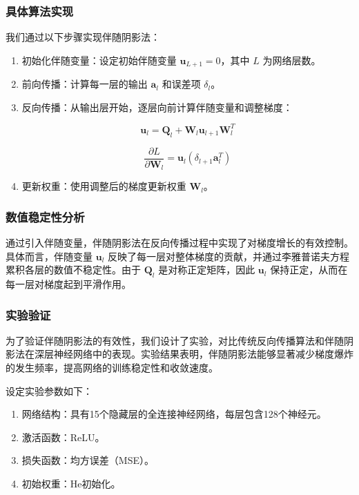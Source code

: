 \documentclass[12pt,a4paper]{amsart}
\begin{document}
\subsubsection{具体算法实现}

我们通过以下步骤实现伴随阴影法：

\begin{enumerate}

  \item 初始化伴随变量：设定初始伴随变量 \( \mathbf{u}_{L+1} = 0 \)，其中 \( L \) 为网络层数。

  \item 前向传播：计算每一层的输出 \( \mathbf{a}_l \) 和误差项 \( \delta_l \)。

  \item 反向传播：从输出层开始，逐层向前计算伴随变量和调整梯度：

  \[ \mathbf{u}_l = \mathbf{Q}_l + \mathbf{W}_l \mathbf{u}_{l+1} \mathbf{W}_l^T \]

  \[ \frac{\partial L}{\partial \mathbf{W}_l} = \mathbf{u}_l (\delta_{l+1} \mathbf{a}_l^T) \]

  \item 更新权重：使用调整后的梯度更新权重 \( \mathbf{W}_l \)。

\end{enumerate}

\subsubsection{数值稳定性分析}

通过引入伴随变量，伴随阴影法在反向传播过程中实现了对梯度增长的有效控制。具体而言，伴随变量 \( \mathbf{u}_l \) 反映了每一层对整体梯度的贡献，并通过李雅普诺夫方程累积各层的数值不稳定性。由于 \( \mathbf{Q}_l \) 是对称正定矩阵，因此 \( \mathbf{u}_l \) 保持正定，从而在每一层对梯度起到平滑作用。

\subsubsection{实验验证}

为了验证伴随阴影法的有效性，我们设计了实验，对比传统反向传播算法和伴随阴影法在深层神经网络中的表现。实验结果表明，伴随阴影法能够显著减少梯度爆炸的发生频率，提高网络的训练稳定性和收敛速度。

设定实验参数如下：

\begin{enumerate}

  \item 网络结构：具有15个隐藏层的全连接神经网络，每层包含128个神经元。

  \item 激活函数：ReLU。

  \item 损失函数：均方误差（MSE）。

  \item 初始权重：He初始化。

\end{enumerate}
\end{document}
